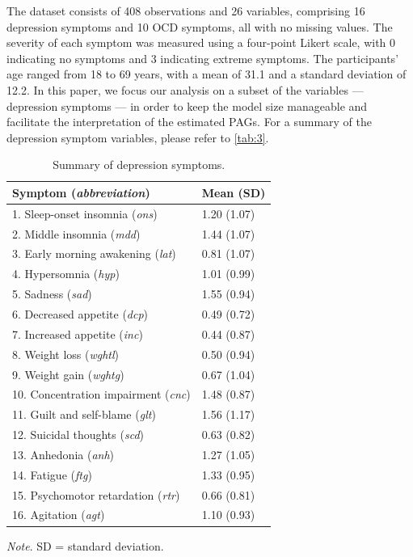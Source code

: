 \documentclass[twoside, 11pt]{article}
\begin{document}
The dataset consists of 408 observations and 26 variables, comprising 16 depression symptoms and 10 OCD symptoms, all with no missing values. The severity of each symptom was measured using a four-point Likert scale, with 0 indicating no symptoms and 3 indicating extreme symptoms. The participants' age ranged from 18 to 69 years, with a mean of 31.1 and a standard deviation of 12.2. In this paper, we focus our analysis on a subset of the variables --- depression symptoms --- in order to keep the model size manageable and facilitate the interpretation of the estimated PAGs.
For a summary of the depression symptom variables, please refer to \autoref{tab:3}.

\begin{table}[!t]
\caption{Summary of depression symptoms.}
\label{tab:3}
\begin{tabularx}{\textwidth}{p{11cm}*{1}{X}}
\toprule
 Symptom (\textit{abbreviation}) & Mean (SD) \\

\midrule
1. Sleep-onset insomnia (\textit{ons})  & 1.20 (1.07) \\
2. Middle insomnia (\textit{mdd})  & 1.44 (1.07) \\
3. Early morning awakening (\textit{lat})  & 0.81 (1.07) \\
4. Hypersomnia (\textit{hyp})  & 1.01 (0.99) \\
5. Sadness (\textit{sad})  & 1.55 (0.94) \\
6. Decreased appetite (\textit{dcp})  & 0.49 (0.72) \\
7. Increased appetite (\textit{inc})  & 0.44 (0.87) \\ 
8. Weight loss (\textit{wghtl})  & 0.50 (0.94) \\
9. Weight gain (\textit{wghtg})  & 0.67 (1.04) \\
10. Concentration impairment (\textit{cnc})  & 1.48 (0.87) \\
11. Guilt and self-blame (\textit{glt})  & 1.56 (1.17) \\
12. Suicidal thoughts (\textit{scd})  & 0.63 (0.82) \\
13. Anhedonia (\textit{anh}) & 1.27 (1.05) \\
14. Fatigue (\textit{ftg})  & 1.33 (0.95) \\
15. Psychomotor retardation (\textit{rtr})  & 0.66 (0.81) \\
16. Agitation (\textit{agt})  & 1.10 (0.93) \\
\bottomrule
\end{tabularx}

\smallskip
\small\textit{Note}. SD = standard deviation.
\end{table}
\end{document}
